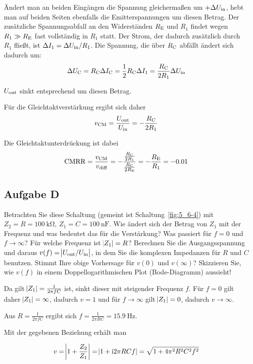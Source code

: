 Ändert man an beiden Eingängen die Spannung gleichermaßen um $+\Delta U_\text{in}$,
hebt man auf beiden Seiten ebenfalls die Emitterspannungen um diesen Betrag.
Der zusätzliche Spannungsabfall an den Widerständen $R_\text{E}$ und $R_1$ findet
wegen $R_1 \gg R_\text{E}$ fast vollständig in $R_1$ statt. Der Strom, der dadurch
zusätzlich durch $R_1$ fließt, ist $\Delta I_1 = \Delta U_\text{in} / R_1$. Die
Spannung, die über $R_\text{C}$ abfällt ändert sich dadurch um:
\[
    \Delta U_\text{C} = R_\text{C}\Delta I_\text{C} = \frac 12R_\text{C}\Delta I_1 = \frac {R_\text{C}} {2R_1} \Delta U_\text{in}
\]

$U_\text{out}$ sinkt entsprechend um diesen Betrag.

Für die Gleichtaktverstärkung ergibt sich daher 
\[
    v_\text{CM} = \frac{U_\text{out}}{U_\text{in}} = -\frac {R_\text{C}} {2R_1}
\]

Die Gleichtaktunterdrückung ist dabei
\[
    \text{CMRR} = \frac {v_\text{CM}}{v_\text{diff}} = -\frac
    {\frac{R_\text{C}}{2R_1}}{\frac{R_\text{C}}{2R_\text{E}}} = -\frac{R_\text{E}}{R_1} = -0.01
\]

\FloatBarrier
\subsection{Aufgabe D}

\begin{problem}
    Betrachten Sie diese Schaltung (gemeint ist Schaltung~\ref{fig:5_6-4}) mit
    $Z_2 = R = \SI {100}{\kilo\ohm}$, $Z_1 = C = \SI {100}{\nano\farad}$. Wie
    ändert sich der Betrag von $Z_1$ mit der Frequenz und was bedeutet das für
    die Verstärkung? Was passiert für $f = 0$ und $f \to \infty$? Für welche
    Frequenz ist $\abs{Z_1} = R$? Berechnen Sie die Ausgangsspannung und
    daraus $v(f) = \abs{U_\text{out} / U_\text{in}}$, in dem Sie die komplexen Impedanzen für
    $R$ und $C$ benutzen. Stimmt Ihre obige Vorhersage für $v(0)$ und
    $v(\infty)$? Skizzieren Sie, wie $v(f)$ in einem Doppellogarithmischen Plot
    (Bode-Diagramm) aussieht!
\end{problem}

Da gilt $\abs{Z_1}=\frac 1{2\pi fC}$ ist, sinkt dieser mit steigender Frequenz
$f$. Für $f = 0$ gilt daher $\abs{Z_1} = \infty$, dadurch $v = 1$ und für $f
\to \infty$ gilt $\abs{Z_1} = 0$, dadurch $v \to \infty$.

Aus $R = \frac 1{2\pi fC}$ ergibt sich $f = \frac 1{2\pi RC} =
\SI{15.9}{\hertz}$.

Mit der gegebenen Beziehung erhält man

\[
    v = \abs{1 + \frac {Z_2}{Z_1}} = \abs{1 + \mathrm i 2\pi RC f} = \sqrt{1 +
    4\pi^2R^2C^2 f^2} 
\]

